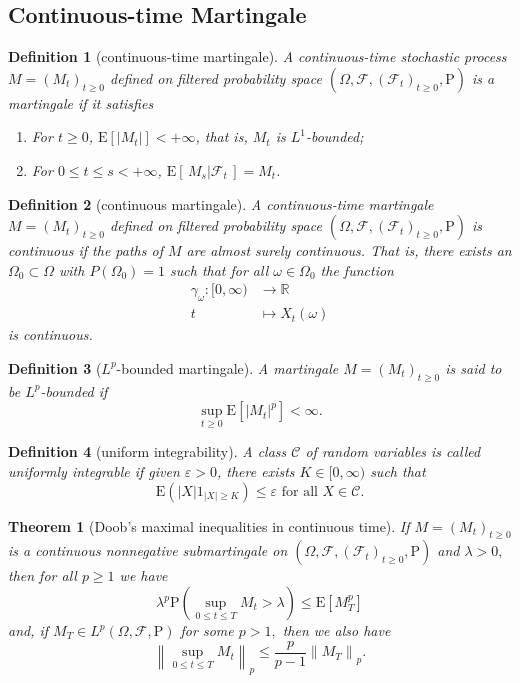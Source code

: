 \documentclass{article}
\newtheorem{definition}{Definition}[section]
\newtheorem{theorem}{Theorem}[section]
\theoremstyle{nonumberplain}
\begin{document}
\subsection{Continuous-time Martingale}
\begin{definition}[continuous-time martingale]
	A continuous-time stochastic process $M=(M_t)_{t\ge 0}$ defined on filtered probability space $(\Omega,\mathcal{F},(\mathcal{F}_{t})_{t\ge0},\mathrm{P})$ is a \emph{martingale} if it satisfies
	\begin{enumerate}
		\item For $t\ge0$, $\mathrm{E}[|M_t|]<+\infty$, that is, $M_t$ is $L^1$-bounded;
		\item For $0\le t\le s<+\infty$, $\mathrm{E}[\,M_{s}|\mathcal{F}_t\,]=M_t$.
	\end{enumerate}
\end{definition}
\begin{definition}[continuous martingale]
	A continuous-time martingale $M=(M_t)_{t\ge 0}$ defined on filtered probability space $(\Omega,\mathcal{F},(\mathcal{F}_{t})_{t\ge0},\mathrm{P})$ is continuous if the paths of $M$ are almost surely continuous. That is, there exists an $\Omega_{0} \subset \Omega$ with $P\left(\Omega_{0}\right)=1$ such that for all $\omega \in \Omega_{0}$ the function
	\begin{align*}
	\gamma_\omega:[0, \infty)&\longrightarrow\mathbb{R}\\
	t&\longmapsto X_{t}(\omega)
	\end{align*}
	is continuous.
\end{definition}

\begin{definition}[$L^p$-bounded martingale]
	A martingale $M=(M_t)_{t\ge0}$ is said to be $L^p$-\emph{bounded} if 
	$$
	\sup _{t \geq 0} \mathrm{E}\left[|M_{t}|^{p}\right]<\infty.
	$$
\end{definition}


\begin{definition}[uniform integrability]
	A class $\mathcal {C}$ of random variables is called \emph{uniformly integrable} if given $\varepsilon >0$, there exists $K\in [0,\infty )$ such that 
	\[
	\mathrm{E}\left(|X| 1_{|X| \geq K}\right) \leq \varepsilon \text { for all } X \in \mathcal{C}.
	\]	
\end{definition}

\begin{theorem}[Doob's maximal inequalities in continuous time]
If $M=(M_{t})_{t\ge0}$ is a continuous nonnegative submartingale on $(\Omega,\mathcal{F},(\mathcal{F}_{t})_{t\ge0},\mathrm{P})$ and $\lambda>0,$ then for all $p \geq 1$ we have
\[
\lambda^{p} \mathrm{P}\left(\sup_{0 \le t \le T} M_{t}>\lambda\right) \le \mathrm{E}\left[M_{T}^{p}\right]
\]
and, if $M_{T} \in L^{p}(\Omega,\mathcal{F},\mathrm{P})$ for some $p>1,$ then we also have
\[
\left\|\sup_{0 \leq t \leq T} M_{t}\right\|_{p} \leq \frac{p}{p-1}\left\|M_{T}\right\|_{p}.
\]
\end{theorem}
\end{document}
